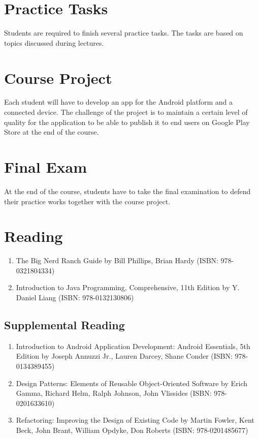 \documentclass[12pt,a4paper,oneside]{article}
\begin{document}
    \section{Practice Tasks}

        Students are required to finish several practice tasks. The tasks are based
        on topics discussed during lectures.

    \section{Course Project}

        Each student will have to develop an app for the Android platform and a connected device. The
        challenge of the project is to maintain a certain level of quality for
        the application to be able to publish it to end users on Google Play
        Store at the end of the course.

    \section{Final Exam}

        At the end of the course, students have to take the final examination to defend their
        practice works together with the course project.

    \section{Reading}

        \begin{enumerate}
        	\item The Big Nerd Ranch Guide by Bill Phillips, Brian Hardy (ISBN: 978-0321804334)
            \item Introduction to Java Programming, Comprehensive, 11th Edition by Y.
            Daniel Liang (ISBN: 978-0132130806)
        \end{enumerate}

        \subsection{Supplemental Reading}

            \begin{enumerate}
                \item Introduction to Android Application Development: Android
                Essentials, 5th Edition by Joseph Annuzzi Jr., Lauren Darcey, Shane
                Conder (ISBN: 978-0134389455)
                \item Design Patterns: Elements of Reusable Object-Oriented
                Software by Erich Gamma, Richard Helm, Ralph Johnson, John
                Vlissides (ISBN: 978-0201633610)
                \item Refactoring: Improving the Design of Existing Code by
                Martin Fowler, Kent Beck, John Brant, William Opdyke, Don
                Roberts (ISBN: 978-0201485677)
            \end{enumerate}
\end{document}
